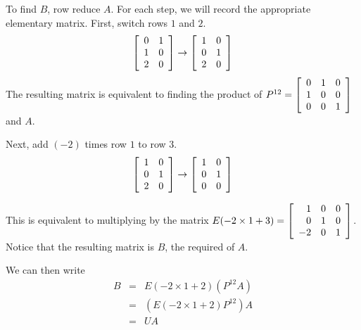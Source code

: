 \begin{solution}
To find $B$, row reduce $A$. For each step, we will record the appropriate elementary matrix. 
First, switch rows $1$ and $2$. 
\[
 \left[
\begin{array}{rr}
0 & 1 \\
1 & 0 \\
2 & 0
\end{array}
\right]
\rightarrow
\left[
\begin{array}{rr}
1 & 0 \\
0 & 1 \\
2 & 0
\end{array}
\right]
\]
The resulting matrix is equivalent to finding the product of 
$ P^{12} =\left[
\begin{array}{rrr}
0 & 1 & 0 \\
1 & 0 & 0 \\
0 & 0 & 1 
\end{array}
\right]$ and $A$. 

Next, add $(-2)$ times row $1$ to row $3$. 
\[
\left[
\begin{array}{rr}
1 & 0 \\
0 & 1 \\
2 & 0
\end{array}
\right]
\rightarrow
\left[
\begin{array}{rr}
1 & 0 \\
0 & 1 \\
0 & 0
\end{array}
\right]
\]

This is equivalent to multiplying by the matrix $E(-2 \times 1 + 3) = 
\left[
\begin{array}{rrr}
1 & 0 & 0 \\
0 & 1 & 0 \\
-2 & 0 & 1 
\end{array}
\right]$. Notice that the resulting matrix is $B$, the required {\rref} of $A$.

We can then write 
\begin{eqnarray*}
B &=& E(-2 \times 1 + 2) \left( P^{12} A \right) \\
&=& \left( E(-2 \times 1 + 2) P^{12} \right) A \\
&=& U A
\end{eqnarray*} 


\end{solution}
